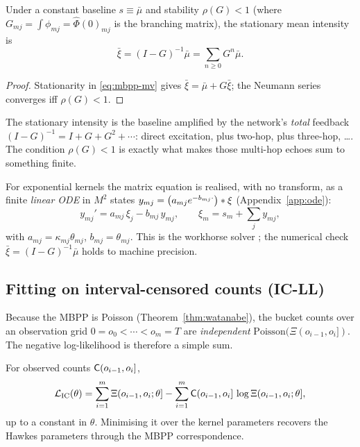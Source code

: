 \begin{proposition}\label{prop:stationary}
Under a constant baseline $s\equiv\bar\mu$ and stability $\rho(G)<1$ (where
$G_{mj}=\int\phi_{mj}=\hat\Phi(0)_{mj}$ is the branching matrix), the stationary
mean intensity is
\begin{equation}
\bar\xi=(I-G)^{-1}\bar\mu=\sum_{n\ge0}G^n\bar\mu .
\end{equation}
\end{proposition}
\begin{proof}
Stationarity in \eqref{eq:mbpp-mv} gives $\bar\xi=\bar\mu+G\bar\xi$; the Neumann
series converges iff $\rho(G)<1$.
\end{proof}

\begin{intuition}
The stationary intensity is the baseline amplified by the network's \emph{total}
feedback $(I-G)^{-1}=I+G+G^2+\cdots$: direct excitation, plus two-hop, plus
three-hop, \dots. The condition $\rho(G)<1$ is exactly what makes those multi-hop
echoes sum to something finite.
\end{intuition}

For exponential kernels the matrix equation is realised, with no transform, as a
finite \emph{linear ODE} in $M^2$ states $y_{mj}=\bigl(a_{mj}e^{-b_{mj}\cdot}\bigr)\ast\xi$
(Appendix~\ref{app:ode}):
\begin{equation}
y_{mj}'=a_{mj}\,\xi_j-b_{mj}\,y_{mj},\qquad \xi_m=s_m+\sum_j y_{mj},
\label{eq:statespace}
\end{equation}
with $a_{mj}=\kappa_{mj}\theta_{mj}$, $b_{mj}=\theta_{mj}$. This is the workhorse
solver ; the numerical check
$\bar\xi=(I-G)^{-1}\bar\mu$ holds to machine precision.

\subsection{Fitting on interval-censored counts (IC-LL)}
\label{sub:icll}

Because the MBPP is Poisson (Theorem~\ref{thm:watanabe}), the bucket counts over an
observation grid $0=o_0<\cdots<o_m=T$ are \emph{independent}
$\mathrm{Poisson}(\Xi(o_{i-1},o_i])$. The negative log-likelihood is therefore a
simple sum.

\begin{proposition}\label{prop:icll}
For observed counts $\mathsf{C}(o_{i-1},o_i]$,
\begin{equation}
\mathcal L_{\mathrm{IC}}(\theta)=\sum_{i=1}^m\Xi(o_{i-1},o_i;\theta]
-\sum_{i=1}^m \mathsf{C}(o_{i-1},o_i]\,\log\Xi(o_{i-1},o_i;\theta],
\label{eq:icll}
\end{equation}
up to a constant in $\theta$. Minimising it over the kernel parameters recovers the
Hawkes parameters through the MBPP correspondence.
\end{proposition}

